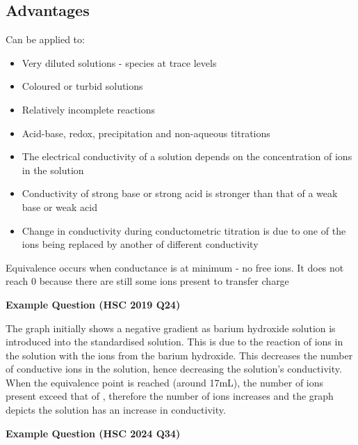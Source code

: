 	\subsection{Advantages}
	
		Can be applied to:
		\begin{itemize}
			\item Very diluted solutions - species at trace levels
			\item Coloured or turbid solutions
			\item Relatively incomplete reactions
			\item Acid-base, redox, precipitation and non-aqueous titrations
		\end{itemize}

	\begin{itemize}
		\item The electrical conductivity of a solution depends on the concentration of ions in the solution
		\item Conductivity of strong base or strong acid is stronger than that of a weak base or weak acid
		\item Change in conductivity during conductometric titration is due to one of the ions being replaced by another of different conductivity
	\end{itemize}

	Equivalence occurs when conductance is at minimum - no free ions. It does not reach 0 because there are still some ions present to transfer charge

	\textbf{Example Question (HSC 2019 Q24)}
	
	The graph initially shows a negative gradient as barium hydroxide solution is introduced into the standardised  solution. This is due to the reaction of  ions in the  solution with the  ions from the barium hydroxide. This decreases the number of conductive ions in the solution, hence decreasing the solution's conductivity. When the equivalence point is reached (around 17mL), the number of  ions present exceed that of , therefore the number of  ions increases and the graph depicts the solution has an increase in conductivity.

	\textbf{Example Question (HSC 2024 Q34)}
	
	\begin{center}
		 \\
	\end{center}

